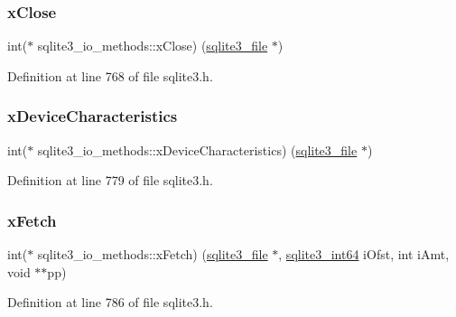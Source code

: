 \subsubsection{\texorpdfstring{x\+Close}{xClose}}
{\footnotesize\ttfamily int($\ast$ sqlite3\+\_\+io\+\_\+methods\+::x\+Close) (\mbox{\hyperlink{structsqlite3__file}{sqlite3\+\_\+file}} $\ast$)}



Definition at line 768 of file sqlite3.\+h.

\mbox{\label{structsqlite3__io__methods_abbf1b4769c310bfee517af815eed93e9}} 
\subsubsection{\texorpdfstring{x\+Device\+Characteristics}{xDeviceCharacteristics}}
{\footnotesize\ttfamily int($\ast$ sqlite3\+\_\+io\+\_\+methods\+::x\+Device\+Characteristics) (\mbox{\hyperlink{structsqlite3__file}{sqlite3\+\_\+file}} $\ast$)}



Definition at line 779 of file sqlite3.\+h.

\mbox{\label{structsqlite3__io__methods_a71e611fc755d95ffbd3e7ecb8cb5fae6}} 
\subsubsection{\texorpdfstring{x\+Fetch}{xFetch}}
{\footnotesize\ttfamily int($\ast$ sqlite3\+\_\+io\+\_\+methods\+::x\+Fetch) (\mbox{\hyperlink{structsqlite3__file}{sqlite3\+\_\+file}} $\ast$, \mbox{\hyperlink{sqlite3_8h_a0a4d3e6c1ad46f90e746b920ab6ca0d2}{sqlite3\+\_\+int64}} i\+Ofst, int i\+Amt, void $\ast$$\ast$pp)}



Definition at line 786 of file sqlite3.\+h.

\mbox{\label{structsqlite3__io__methods_a913b12deb1dcae2c61b90776bcd9d19c}} 
